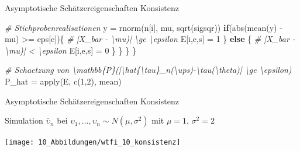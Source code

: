 \documentclass[
  8pt,
  ignorenonframetext,
]{beamer}
\newenvironment{Shaded}{\begin{snugshade}}{\end{snugshade}}
\newcommand{\CommentTok}[1]{\textcolor[rgb]{0.56,0.35,0.01}{\textit{#1}}}
\newcommand{\ControlFlowTok}[1]{\textcolor[rgb]{0.13,0.29,0.53}{\textbf{#1}}}
\newcommand{\DecValTok}[1]{\textcolor[rgb]{0.00,0.00,0.81}{#1}}
\newcommand{\FunctionTok}[1]{\textcolor[rgb]{0.00,0.00,0.00}{#1}}
\newcommand{\NormalTok}[1]{#1}
\newcommand{\OtherTok}[1]{\textcolor[rgb]{0.56,0.35,0.01}{#1}}
\newcommand{\SpecialCharTok}[1]{\textcolor[rgb]{0.00,0.00,0.00}{#1}}
\newcommand{\ups} {\upsilon}
\begin{document}
\begin{frame}[fragile]{\small Asymptotische Schätzereigenschaften
\textbar{} Konsistenz}
\begin{Shaded}
\begin{Highlighting}[]
            \CommentTok{\# Stichprobenrealisationen}
\NormalTok{            y   }\OtherTok{=} \FunctionTok{rnorm}\NormalTok{(n[i], mu, }\FunctionTok{sqrt}\NormalTok{(sigsqr))}
            \ControlFlowTok{if}\NormalTok{(}\FunctionTok{abs}\NormalTok{(}\FunctionTok{mean}\NormalTok{(y) }\SpecialCharTok{{-}}\NormalTok{ mu) }\SpecialCharTok{\textgreater{}=}\NormalTok{ eps[e])\{        }\CommentTok{\# |X\_bar {-} \textbackslash{}mu)| \textbackslash{}ge \textbackslash{}epsilon}
\NormalTok{                E[i,e,s] }\OtherTok{=} \DecValTok{1}
\NormalTok{            \} }\ControlFlowTok{else}\NormalTok{ \{                                }\CommentTok{\# |X\_bar {-} \textbackslash{}mu)| \textless{} \textbackslash{}epsilon}
\NormalTok{                E[i,e,s] }\OtherTok{=} \DecValTok{0}
\NormalTok{            \}}
\NormalTok{        \}}
\NormalTok{    \}}
\NormalTok{\}}

\CommentTok{\# Schaetzung von \textbackslash{}mathbb\{P\}(|\textbackslash{}hat\{\textbackslash{}tau\}\_n(\textbackslash{}ups){-}\textbackslash{}tau(\textbackslash{}theta)| \textbackslash{}ge \textbackslash{}epsilon)}
\NormalTok{P\_hat       }\OtherTok{=} \FunctionTok{apply}\NormalTok{(E, }\FunctionTok{c}\NormalTok{(}\DecValTok{1}\NormalTok{,}\DecValTok{2}\NormalTok{), mean)}
\end{Highlighting}
\end{Shaded}
\end{frame}

\begin{frame}{\small Asymptotische Schätzereigenschaften \textbar{}
Konsistenz}
\protect\hypertarget{asymptotische-schuxe4tzereigenschaften-konsistenz-5}{}
\small

Simulation \(\bar{\ups}_n\) bei
\(\ups_1,...,\ups_n \sim N(\mu,\sigma^2)\) mit \(\mu = 1\),
\(\sigma^2 = 2\)

\begin{center}\texttt{[image: 10\_Abbildungen/wtfi\_10\_konsistenz]} \end{center}
\end{frame}
\end{document}
